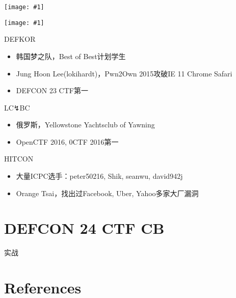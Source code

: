 \documentclass{beamer}
\newcommand{\image}[1]{
  \begin{frame}
    \texttt{[image: \#1]}
  \end{frame}
}
\begin{document}
\image{img/defkor.jpg}

\image{img/lokihardt.jpg}

\begin{frame}
  \begin{block}{DEFKOR}
    \begin{itemize}[<+-|alert@+>]
      \item 韩国梦之队，Best of Best计划学生
      \item Jung Hoon Lee(lokihardt)，Pwn2Own 2015攻破IE 11 Chrome Safari
      \item DEFCON 23 CTF第一
    \end{itemize}
  \end{block}
\end{frame}

\begin{frame}
  \begin{block}{LC↯BC}
    \begin{itemize}[<+-|alert@+>]
      \item 俄罗斯，Yellowstone Yachtsclub of Yawning
      \item OpenCTF 2016, 0CTF 2016第一
    \end{itemize}
  \end{block}
\end{frame}

\begin{frame}
  \begin{block}{HITCON}
    \begin{itemize}[<+-|alert@+>]
      \item 大量ICPC选手：peter50216, Shik, seanwu, david942j
      \item Orange Tsai，找出过Facebook, Uber, Yahoo多家大厂漏洞
    \end{itemize}
  \end{block}
\end{frame}

\section{DEFCON 24 CTF CB}

\begin{frame}
  \begin{block}{实战}
  \end{block}
\end{frame}

\section{References}
\end{document}
